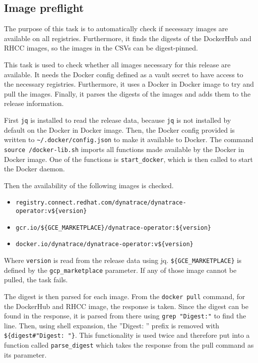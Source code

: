 \subsection{Image preflight}\label{subsec:image-preflight}

The purpose of this task is to automatically check if necessary images are available on all registries.
Furthermore, it finds the digests of the DockerHub and RHCC images, so the images in the CSVs can be digest-pinned.

This task is used to check whether all images necessary for this release are available.
It needs the Docker config defined as a vault secret to have access to the necessary registries.
Furthermore, it uses a Docker in Docker image to try and pull the images.
Finally, it parses the digests of the images and adds them to the release information.

First \verb|jq| is installed to read the release data, because \verb|jq| is not installed by default on the Docker in Docker image.
Then, the Docker config provided is written to \verb|~/.docker/config.json| to make it available to Docker.
The command \verb|source /docker-lib.sh| imports all functions made available by the Docker in Docker image.
One of the functions is \verb|start_docker|, which is then called to start the Docker daemon.

Then the availability of the following images is checked.
\begin{itemize}
    \item \verb|registry.connect.redhat.com/dynatrace/dynatrace-operator:v${version}|
    \item \verb|gcr.io/${GCE_MARKETPLACE}/dynatrace-operator:${version}|
    \item \verb|docker.io/dynatrace/dynatrace-operator:v${version}|
\end{itemize}

Where \verb|version| is read from the release data using jq.
\verb|${GCE_MARKETPLACE}| is defined by the \verb|gcp_marketplace| parameter.
If any of those image cannot be pulled, the task fails.

The digest is then parsed for each image.
From the \verb|docker pull| command, for the DockerHub and RHCC image, the response is taken.
Since the digest can be found in the response, it is parsed from there using \verb|grep "Digest:"| to find the line.
Then, using shell expansion, the ''Digest: '' prefix is removed with \verb|${digest#"Digest: "}|.
This functionality is used twice and therefore put into a function called \verb|parse_digest| which takes the response from the pull command as its parameter.
